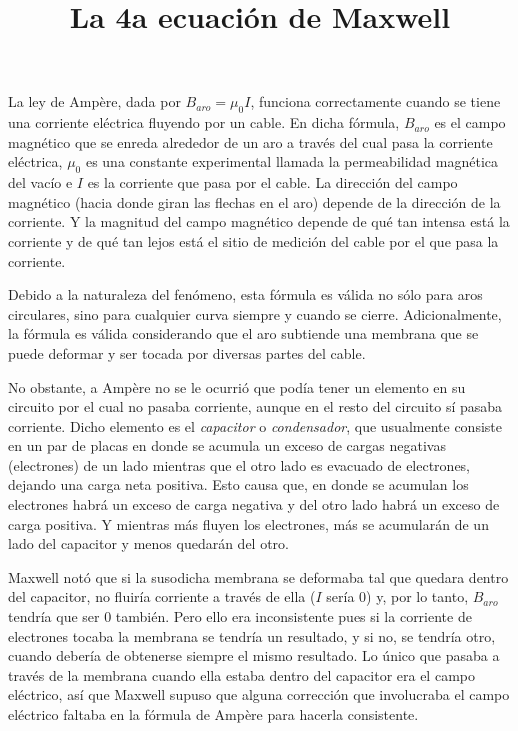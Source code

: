 \documentclass{article}
\begin{document}
\title{La 4a ecuación de Maxwell}
\date{}
\maketitle



La ley de Ampère, dada por $B_{aro}=\mu_0I$, funciona correctamente cuando se tiene una corriente eléctrica fluyendo por un cable. En dicha fórmula, $B_{aro}$ es el campo magnético que se enreda alrededor de un aro a través del cual pasa la corriente eléctrica, $\mu_0$ es una constante experimental llamada la permeabilidad magnética del vacío e $I$ es la corriente que pasa por el cable. La dirección del campo magnético (hacia donde giran las flechas en el aro) depende de la dirección de la corriente. Y la magnitud del campo magnético depende de qué tan intensa está la corriente y de qué tan lejos está el sitio de medición del cable por el que pasa la corriente.\bigskip

Debido a la naturaleza del fenómeno, esta fórmula es válida no sólo para aros circulares, sino para cualquier curva siempre y cuando se cierre. Adicionalmente, la fórmula es válida considerando que el aro subtiende una membrana que se puede deformar y ser tocada por diversas partes del cable.\bigskip

No obstante, a Ampère no se le ocurrió que podía tener un elemento en su circuito por el cual no pasaba corriente, aunque en el resto del circuito sí pasaba corriente. Dicho elemento es el \emph{capacitor} o \emph{condensador}, que usualmente consiste en un par de placas en donde se acumula un exceso de cargas negativas (electrones) de un lado mientras que el otro lado es evacuado de electrones, dejando una carga neta positiva. Esto causa que, en donde se acumulan los electrones habrá un exceso de carga negativa y del otro lado habrá un exceso de carga positiva. Y mientras más fluyen los electrones, más se acumularán de un lado del capacitor y menos quedarán del otro.\bigskip

Maxwell notó que si la susodicha membrana se deformaba tal que quedara dentro del capacitor, no fluiría corriente a través de ella ($I$ sería 0) y, por lo tanto, $B_{aro}$ tendría que ser 0 también. Pero ello era inconsistente pues si la corriente de electrones tocaba la membrana se tendría un resultado, y si no, se tendría otro, cuando debería de obtenerse siempre el mismo resultado. Lo único que pasaba a través de la membrana cuando ella estaba dentro del capacitor era el campo eléctrico, así que Maxwell supuso que alguna corrección que involucraba el campo eléctrico faltaba en la fórmula de Ampère para hacerla consistente.\bigskip
\end{document}
